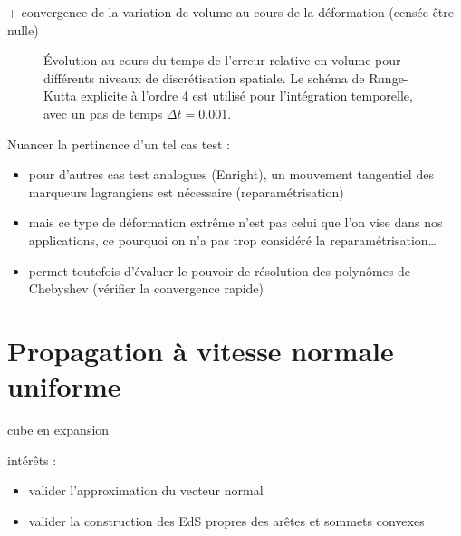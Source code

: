 + convergence de la variation de volume au cours de la déformation (censée être nulle)\\
\begin{figure}
  \centering
  \caption{Évolution au cours du temps de l'erreur relative en volume pour différents niveaux de discrétisation spatiale. Le schéma de Runge-Kutta explicite à l'ordre 4 est utilisé pour l'intégration temporelle, avec un pas de temps $\Delta t = 0.001$.}
  \label{fig:vortex_error_volume_vs_time}
\end{figure}

Nuancer la pertinence d'un tel cas test :
\begin{itemize}
	\item pour d'autres cas test analogues (\eg Enright), un mouvement tangentiel des marqueurs lagrangiens est nécessaire (reparamétrisation)
	\item mais ce type de déformation extrême n'est pas celui que l'on vise dans nos applications, ce pourquoi on n'a pas trop considéré la reparamétrisation\ldots
	\item permet toutefois d'évaluer le pouvoir de résolution des polynômes de Chebyshev (vérifier la convergence rapide)
\end{itemize}

\section{Propagation à vitesse normale uniforme}
cube en expansion\par
intérêts :
\begin{itemize}
	\item valider l'approximation du vecteur normal
	\item valider la construction des EdS propres des arêtes et sommets convexes
\end{itemize}